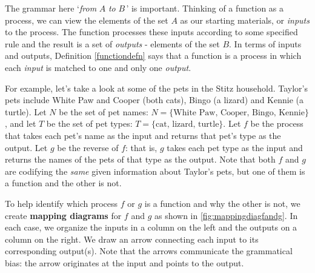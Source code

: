 The grammar here `\textit{from} $A$ \textit{to} $B\,$'  is important.  Thinking of a function as a process, we can view the elements of the set $A$ as our starting materials, or \textit{inputs} to the process.  The function  processes these inputs according to some specified rule and the result is a set of  \textit{outputs}  - elements of the set $B$. In terms of inputs and outputs, Definition \ref{functiondefn}  says that a function is a process in which each \textit{input} is matched to one and only one \textit{output}.

For example, let's take a look at some of the pets in the Stitz household.  Taylor's pets include White Paw and Cooper (both cats), Bingo (a lizard) and Kennie (a turtle).  Let $N$ be the set of pet names: $N = \{ \text{White Paw, Cooper, Bingo, Kennie} \}$, and let $T$ be the set of pet types:  $T = \{ \text{cat, lizard, turtle} \}$.   Let $f$ be the process that takes each pet's name as the input and returns that pet's type as the output. Let $g$ be the reverse of $f$:  that is, $g$ takes each pet type as the input and returns the names of the pets of that type as the output.   Note that both $f$ and $g$ are codifying the \textit{same} given information about Taylor's pets,  but one of them is a function and the other is not.  

To help identify which process $f$ or $g$ is a function and  why the other is not, we create   \textbf{mapping diagrams} for $f$ and $g$ as shown in \autoref{fig:mappingdiagfandg}.  In each case, we organize the inputs in a column on the left and the outputs on a column on the right.  We draw an arrow connecting each input to its corresponding output(s).  Note that the arrows communicate the grammatical bias: the arrow originates at the input and points to the output.

